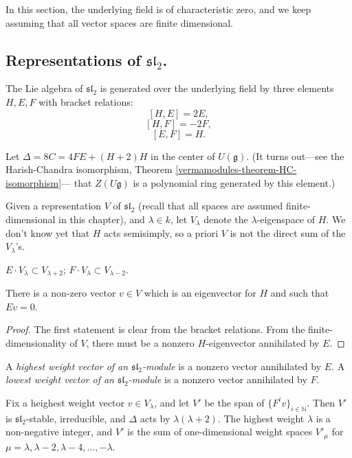 In this section, the underlying field is of characteristic zero, and we keep assuming that all vector spaces are finite dimensional.

\subsection{Representations of $\mathfrak{sl}_2$.}
\label{subsection-representations-sl2}

The Lie algebra of $\mathfrak{sl}_2$ is generated over the underlying field by three elements $H, E, F$ with bracket relations:
$$[H,E]=2E,$$
$$[H,F]=-2F,$$
$$[E,F] = H.$$

Let $\Delta = 8 C = 4FE + (H+2) H$ in the center of $U(\mathfrak g)$. (It turns out---see the Harish-Chandra isomorphism, Theorem \ref{vermamodules-theorem-HC-isomorphism}--- that $Z(U\mathfrak g)$ is a polynomial ring generated by this element.)

Given a representation $V$ of $\mathfrak{sl}_2$ (recall that all spaces are assumed finite-dimensional in this chapter), and $\lambda\in k$, let $V_\lambda$ denote the $\lambda$-eigenspace of $H$. We don't know yet that $H$ acts semisimply, so a priori $V$ is not the direct sum of the $V_\lambda$'s. 

\begin{lemma}
\label{lemma-shift-eigenspaces}
 $E\cdot V_\lambda\subset V_{\lambda+2}$; $F\cdot V_\lambda\subset V_{\lambda-2}$.

There is a non-zero vector $v\in V$ which is an eigenvector for $H$ and such that $Ev=0$. 
\end{lemma}

\begin{proof}
The first statement is clear from the bracket relations. From the finite-dimensionality of $V$, there must be a nonzero $H$-eigenvector annihilated by $E$.
\end{proof}

\begin{definition}
\label{definition-highest-weight}
A {\it highest weight vector of an $\mathfrak{sl}_2$-module} is a nonzero vector annihilated by $E$. A {\it lowest weight vector of an $\mathfrak{sl}_2$-module} is a nonzero vector annihilated by $F$. 
\end{definition}



\begin{proposition}
\label{proposition-sl2-irreducibles}
 Fix a heighest weight vector $v\in V_\lambda$, and let $V'$ be the span of $\{F^iv\}_{i\in\mathbb N}$. Then $V'$ is $\mathfrak{sl}_2$-stable, irreducible, and $\Delta$ acts by $\lambda(\lambda + 2)$. The highest weight $\lambda$ is a non-negative integer, and $V'$ is the sum of one-dimensional weight spaces $V'_{\mu}$ for $\mu = \lambda, \lambda-2,\lambda-4, \dots, -\lambda$.

\end{proposition}


